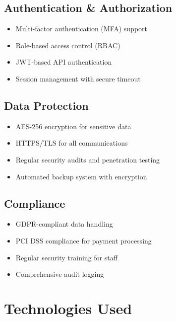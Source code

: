 \begin{tcolorbox}[
    enhanced,
    title={Security Implementation},
    attach boxed title to top left,
    boxed title style={
        colback=warning!50,
        colframe=warning!50,
        arc=0mm,
    },
    colback=white,
    colframe=warning!50,
    arc=0mm,
    fonttitle=\bfseries
]
    \subsection{Authentication \& Authorization}
    \begin{itemize}
        \item Multi-factor authentication (MFA) support
        \item Role-based access control (RBAC)
        \item JWT-based API authentication
        \item Session management with secure timeout
    \end{itemize}

    \subsection{Data Protection}
    \begin{itemize}
        \item AES-256 encryption for sensitive data
        \item HTTPS/TLS for all communications
        \item Regular security audits and penetration testing
        \item Automated backup system with encryption
    \end{itemize}

    \subsection{Compliance}
    \begin{itemize}
        \item GDPR-compliant data handling
        \item PCI DSS compliance for payment processing
        \item Regular security training for staff
        \item Comprehensive audit logging
    \end{itemize}
\end{tcolorbox}

\section{Technologies Used}

